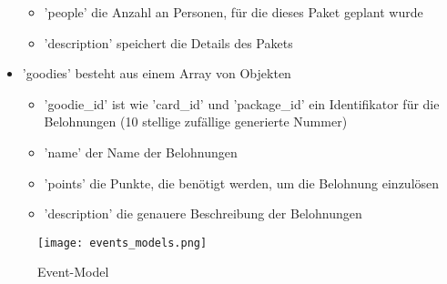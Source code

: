 \begin{itemize}
\begin{itemize}
		\item 'people' die Anzahl an Personen, für die dieses Paket geplant wurde
		\item 'description' speichert die Details des Pakets
	\end{itemize}
	\item 'goodies' besteht aus einem Array von Objekten
	\begin{itemize}
		\item 'goodie\_id' ist wie 'card\_id' und 'package\_id' ein Identifikator für die Belohnungen (10 stellige zufällige generierte Nummer)
		\item 'name' der Name der Belohnungen
		\item 'points' die Punkte, die benötigt werden, um die Belohnung einzulösen
		\item 'description' die genauere Beschreibung der Belohnungen
	\end{itemize}				
\end{itemize}
\begin{figure}[H]
	\centering
	\texttt{[image: events\_models.png]}
	\caption{Event-Model}
\end{figure}	
\newpage			
